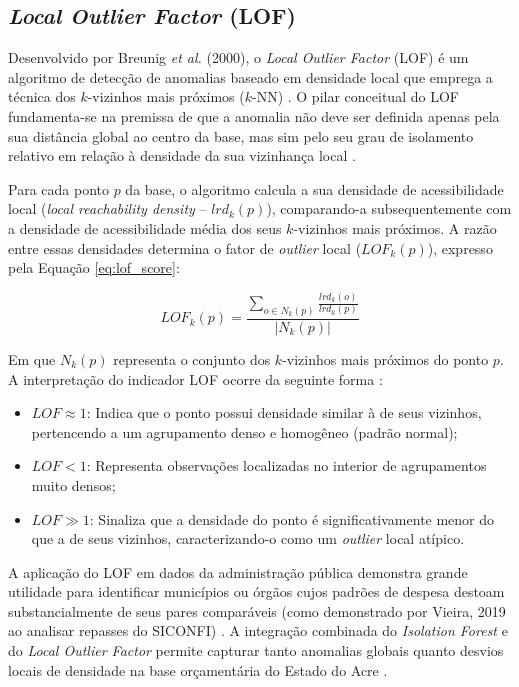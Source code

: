 \documentclass[
    12pt,               %
    openright,          %
    oneside,            %
    a4paper,            %
    chapter=TITLE,      %
    sumario=tradicional,%
    english,            %
    brazilian,          %
 ]{abntex2}
\begin{document}
\subsection{\textit{Local Outlier Factor} (LOF)}

Desenvolvido por Breunig \textit{et al.} (2000), o \textit{Local Outlier Factor} (LOF) é um algoritmo de detecção de anomalias baseado em densidade local que emprega a técnica dos $k$-vizinhos mais próximos ($k$-NN) \cite{breunig2000lof}. O pilar conceitual do LOF fundamenta-se na premissa de que a anomalia não deve ser definida apenas pela sua distância global ao centro da base, mas sim pelo seu grau de isolamento relativo em relação à densidade da sua vizinhança local \cite{breunig2000lof, vieira2019}.

Para cada ponto $p$ da base, o algoritmo calcula a sua densidade de acessibilidade local (\textit{local reachability density} -- $lrd_k(p)$), comparando-a subsequentemente com a densidade de acessibilidade média dos seus $k$-vizinhos mais próximos. A razão entre essas densidades determina o fator de \textit{outlier} local ($LOF_k(p)$), expresso pela Equação \ref{eq:lof_score}:

\begin{equation}\label{eq:lof_score}
LOF_k(p) = \frac{\sum_{o \in N_k(p)} \frac{lrd_k(o)}{lrd_k(p)}}{|N_k(p)|}
\end{equation}

Em que $N_k(p)$ representa o conjunto dos $k$-vizinhos mais próximos do ponto $p$. A interpretação do indicador LOF ocorre da seguinte forma \cite{breunig2000lof}:
\begin{itemize}
    \item $LOF \approx 1$: Indica que o ponto possui densidade similar à de seus vizinhos, pertencendo a um agrupamento denso e homogêneo (padrão normal);
    \item $LOF < 1$: Representa observações localizadas no interior de agrupamentos muito densos;
    \item $LOF \gg 1$: Sinaliza que a densidade do ponto é significativamente menor do que a de seus vizinhos, caracterizando-o como um \textit{outlier} local atípico.
\end{itemize}

A aplicação do LOF em dados da administração pública demonstra grande utilidade para identificar municípios ou órgãos cujos padrões de despesa destoam substancialmente de seus pares comparáveis (como demonstrado por Vieira, 2019 ao analisar repasses do SICONFI) \cite{vieira2019}. A integração combinada do \textit{Isolation Forest} e do \textit{Local Outlier Factor} permite capturar tanto anomalias globais quanto desvios locais de densidade na base orçamentária do Estado do Acre \cite{breunig2000lof, liu2008isolation}.
\end{document}
